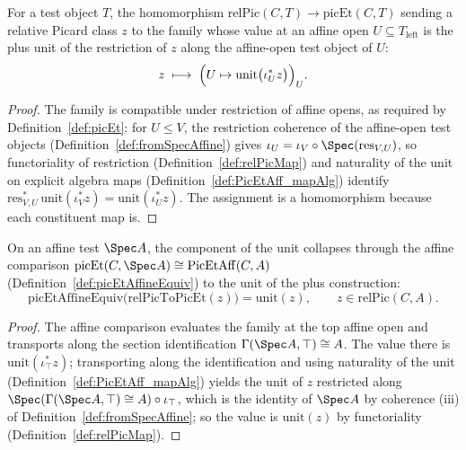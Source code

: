 \begin{definition}
  \label{def:relPicToPicEt}
  \leanok
  For a test object \(T\), the homomorphism
  \(\mathrm{relPic}(C,T) \to \mathrm{picEt}(C,T)\) sending a relative Picard class \(z\) to
  the family whose value at an affine open \(U \subseteq T_{\mathrm{left}}\) is the plus unit
  of the restriction of \(z\) along the affine-open test object of \(U\):
  \[
    z \;\longmapsto\;
    \Bigl( U \mapsto \mathrm{unit}\bigl(\iota_U^{*} z\bigr) \Bigr)_{U} .
  \]
\end{definition}
\begin{proof}
  \leanok
  The family is compatible under restriction of affine opens, as required by
  Definition~\ref{def:picEt}: for \(U \le V\), the restriction coherence of the affine-open
  test objects (Definition~\ref{def:fromSpecAffine}) gives \(\iota_U = \iota_V \circ
  \Spec(\mathrm{res}_{V,U})\), so functoriality of restriction (Definition~\ref{def:relPicMap})
  and naturality of the unit on explicit algebra maps (Definition~\ref{def:PicEtAff_mapAlg})
  identify \(\mathrm{res}_{V,U}^{*}\,\mathrm{unit}(\iota_V^{*}z) =
  \mathrm{unit}(\iota_U^{*}z)\). The assignment is a homomorphism because each constituent
  map is.
\end{proof}

\begin{theorem}
  \label{thm:picEtAffineEquiv_relPicToPicEt}
  \leanok
  On an affine test \(\Spec A\), the component of the unit collapses through the affine
  comparison \(\mathrm{picEt}(C, \Spec A) \cong \mathrm{PicEtAff}(C, A)\)
  (Definition~\ref{def:picEtAffineEquiv}) to the unit of the plus construction:
  \[
    \mathrm{picEtAffineEquiv}\bigl(\mathrm{relPicToPicEt}(z)\bigr)
      = \mathrm{unit}(z), \qquad z \in \mathrm{relPic}(C,A).
  \]
\end{theorem}
\begin{proof}
  \leanok
  The affine comparison evaluates the family at the top affine open and transports along the
  section identification \(\Gamma(\Spec A, \top) \cong A\). The value there is
  \(\mathrm{unit}(\iota_\top^{*} z)\); transporting along the identification and using
  naturality of the unit (Definition~\ref{def:PicEtAff_mapAlg}) yields the unit of
  \(z\) restricted along \(\Spec(\Gamma(\Spec A,\top) \cong A) \circ \iota_\top\), which is
  the identity of \(\Spec A\) by coherence (iii) of Definition~\ref{def:fromSpecAffine}; so
  the value is \(\mathrm{unit}(z)\) by functoriality (Definition~\ref{def:relPicMap}).
\end{proof}

